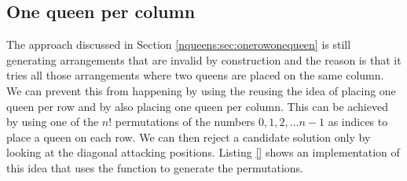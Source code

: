 \subsection{One queen per column}
\label{nqueens:sec:onequeenpercolumn}
The approach discussed in Section \ref{nqueens:sec:onerowonequeen} is still 
generating arrangements that are invalid by construction and the reason is that
it tries all those arrangements where two queens are placed on the same column. 
We can prevent this from happening by using the  reusing the idea of placing one queen per row
and by also placing one queen per column. This can be achieved by using 
one of the $n!$ permutations of the numbers  $0,1,2,\ldots n-1$ as indices to place a queen on each row.
We can then reject a candidate solution only by looking at the diagonal attacking positions. 
Listing \ref{} shows an implementation of this idea that uses the 
 function to generate the permutations.



